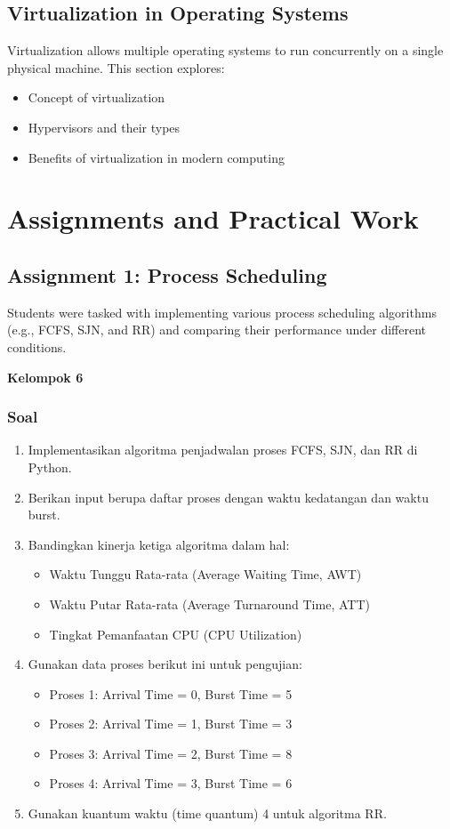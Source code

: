 \documentclass[12pt]{article}
\begin{document}
\subsection{Virtualization in Operating Systems}
Virtualization allows multiple operating systems to run concurrently on a single physical machine. This section explores:
\begin{itemize}
    \item Concept of virtualization
    \item Hypervisors and their types
    \item Benefits of virtualization in modern computing
\end{itemize}

\section{Assignments and Practical Work}
\subsection{Assignment 1: Process Scheduling}
Students were tasked with implementing various process scheduling algorithms (e.g., FCFS, SJN, and RR) and comparing their performance under different conditions.

\vspace{1cm}
\textbf{Kelompok 6}
\subsubsection{Soal}
\begin{enumerate}
    \item Implementasikan algoritma penjadwalan proses FCFS, SJN, dan RR di Python.
    \item Berikan input berupa daftar proses dengan waktu kedatangan dan waktu burst.
    \item Bandingkan kinerja ketiga algoritma dalam hal:
    \begin{itemize}
        \item Waktu Tunggu Rata-rata (Average Waiting Time, AWT)
        \item Waktu Putar Rata-rata (Average Turnaround Time, ATT)
        \item Tingkat Pemanfaatan CPU (CPU Utilization)
    \end{itemize}
    \item Gunakan data proses berikut ini untuk pengujian:
    \begin{itemize}
        \item Proses 1: Arrival Time = 0, Burst Time = 5
        \item Proses 2: Arrival Time = 1, Burst Time = 3
        \item Proses 3: Arrival Time = 2, Burst Time = 8
        \item Proses 4: Arrival Time = 3, Burst Time = 6
    \end{itemize}
    \item Gunakan kuantum waktu (time quantum) 4 untuk algoritma RR.
\end{enumerate}
\end{document}
